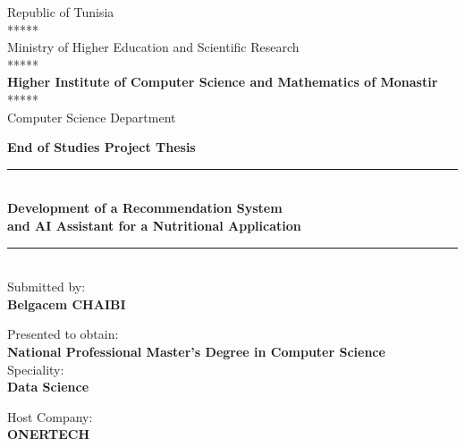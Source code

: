 \begin{titlepage}

\begin{center}
    {Republic of Tunisia\\
    ***** \\
    Ministry of Higher Education and Scientific Research\\
    ***** \\[0.2cm] \textbf{Higher Institute of Computer Science and Mathematics of Monastir\\}
    ***** \\[0.2cm]
    Computer Science Department}\\[1cm]
    \vspace{0.6cm}

    \Large\textbf{End of Studies Project Thesis} \\
    \vspace{0.4cm}


    \rule{\linewidth}{0.5mm} \\[0.1cm]
    {\large \bfseries Development of a Recommendation System \\and AI Assistant for a Nutritional Application
    \\[0.1cm] }
    \rule{\linewidth}{0.5mm} \\[0.5cm]

    \vspace{1cm}
    \large Submitted by: \\
    \textbf{Belgacem CHAIBI} \\
    \vspace{0.6cm}

    Presented to obtain: \\
    \textbf{National Professional Master’s Degree in Computer Science} \\
    \vspace{0.3cm}
    Speciality: \\
    \textbf{Data Science}

    \vspace{0.6cm}

    Host Company: \\
    \textbf{ONERTECH} \\
    \vspace{0.6cm}


\end{center}
\end{titlepage}
